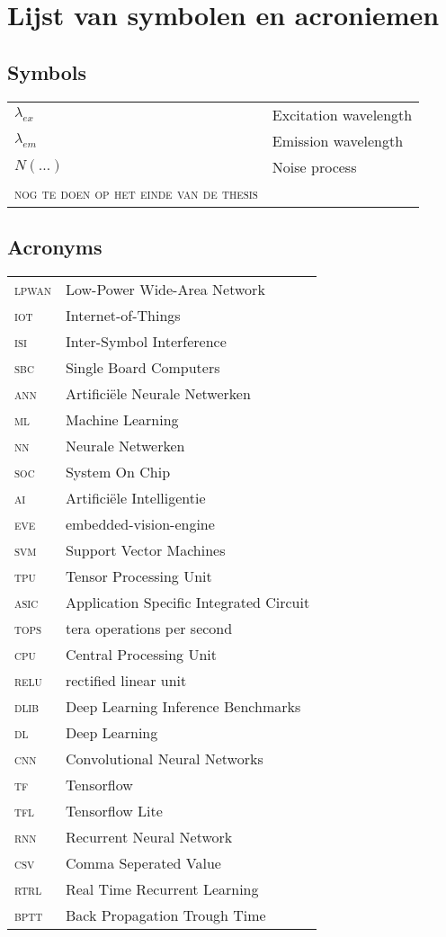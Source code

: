 \chapter*{Lijst van symbolen en acroniemen}

\section*{Symbols}


\begin{longtable}{ll}
$\lambda_{ex}$  &       Excitation wavelength\\
$\lambda_{em}$  &	Emission wavelength\\
$N(\ldots)$	&	Noise process\\
\textsc{nog te doen op het einde van de thesis}
\end{longtable}


\section*{Acronyms}

\begin{longtable}{ll}
\textsc{lpwan}	& Low-Power Wide-Area Network\\
\textsc{iot}	& Internet-of-Things\\
\textsc{isi}	& Inter-Symbol Interference\\
\textsc{sbc}	& Single Board Computers\\
\textsc{ann}	& Artifici\"ele Neurale Netwerken\\
\textsc{ml}	& Machine Learning\\
\textsc{nn}	& Neurale Netwerken\\
\textsc{soc}	& System On Chip\\
\textsc{ai}	& Artifici\"ele Intelligentie\\
\textsc{eve}	& embedded-vision-engine\\
\textsc{svm}	& Support Vector Machines\\
\textsc{tpu}	& Tensor Processing Unit\\
\textsc{asic}	& Application Specific Integrated Circuit\\
\textsc{tops}	& tera operations per second\\
\textsc{cpu}	& Central Processing Unit\\
\textsc{relu}	& rectified linear unit\\
\textsc{dlib}	& Deep Learning Inference Benchmarks\\
\textsc{dl}	& Deep Learning\\
\textsc{cnn}	& Convolutional Neural Networks\\
\textsc{tf}	& Tensorflow\\
\textsc{tfl}	& Tensorflow Lite\\
\textsc{rnn}	& Recurrent Neural Network\\
\textsc{csv}	& Comma Seperated Value\\
\textsc{rtrl}	& Real Time Recurrent Learning\\
\textsc{bptt}	& Back Propagation Trough Time\\


\end{longtable}


